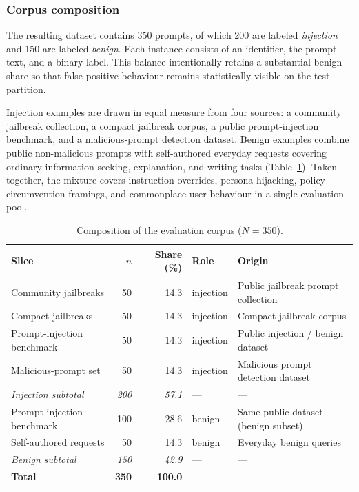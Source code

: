 \subsubsection{Corpus composition}

The resulting dataset contains 350 prompts, of which 200 are labeled \emph{injection} and 150 are labeled \emph{benign}.
Each instance consists of an identifier, the prompt text, and a binary label.
This balance intentionally retains a substantial benign share so that false-positive behaviour remains statistically visible on the test partition.

Injection examples are drawn in equal measure from four sources: a community jailbreak collection, a compact jailbreak corpus, a public prompt-injection benchmark, and a malicious-prompt detection dataset.
Benign examples combine public non-malicious prompts with self-authored everyday requests covering ordinary information-seeking, explanation, and writing tasks (Table~\ref{tab:data-sources}).
Taken together, the mixture covers instruction overrides, persona hijacking, policy circumvention framings, and commonplace user behaviour in a single evaluation pool.

\begin{table}[t]
  \centering
  \caption{Composition of the evaluation corpus (\(N=350\)).}
  \label{tab:data-sources}
  \begin{tabular}{lrrlp{4.6cm}}
    \hline
    Slice & \(n\) & Share (\%) & Role & Origin \\
    \hline
    Community jailbreaks & 50 & 14.3 & injection & Public jailbreak prompt collection \\
    Compact jailbreaks & 50 & 14.3 & injection & Compact jailbreak corpus \\
    Prompt-injection benchmark & 50 & 14.3 & injection & Public injection / benign dataset \\
    Malicious-prompt set & 50 & 14.3 & injection & Malicious prompt detection dataset \\
    \textit{Injection subtotal} & \textit{200} & \textit{57.1} & --- & --- \\
    \hline
    Prompt-injection benchmark & 100 & 28.6 & benign & Same public dataset (benign subset) \\
    Self-authored requests & 50 & 14.3 & benign & Everyday benign queries \\
    \textit{Benign subtotal} & \textit{150} & \textit{42.9} & --- & --- \\
    \hline
    \textbf{Total} & \textbf{350} & \textbf{100.0} & --- & --- \\
    \hline
  \end{tabular}
\end{table}

